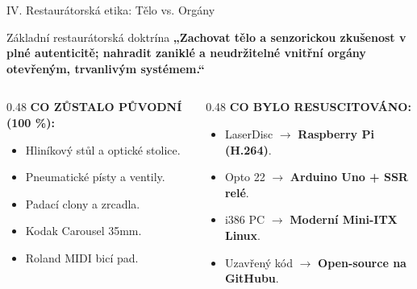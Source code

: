 \documentclass[aspectratio=169,11pt]{beamer}
\begin{document}
\begin{frame}{IV. Restaurátorská etika: Tělo vs. Orgány}
  \begin{block}{Základní restaurátorská doktrína}
    \centering\large\textbf{„Zachovat tělo a senzorickou zkušenost v plné autenticitě; nahradit zaniklé a neudržitelné vnitřní orgány otevřeným, trvanlivým systémem.“}
  \end{block}
  \vspace{0.4cm}
  \begin{columns}
    \begin{column}{0.48\textwidth}
      \textbf{CO ZŮSTALO PŮVODNÍ (100 \%):}
      \begin{itemize}
        \item Hliníkový stůl a optické stolice.
        \item Pneumatické písty a ventily.
        \item Padací clony a zrcadla.
        \item Kodak Carousel 35mm.
        \item Roland MIDI bicí pad.
      \end{itemize}
    \end{column}
    \begin{column}{0.48\textwidth}
      \textbf{CO BYLO RESUSCITOVÁNO:}
      \begin{itemize}
        \item LaserDisc $\rightarrow$ \textbf{Raspberry Pi (H.264)}.
        \item Opto 22 $\rightarrow$ \textbf{Arduino Uno + SSR relé}.
        \item i386 PC $\rightarrow$ \textbf{Moderní Mini-ITX Linux}.
        \item Uzavřený kód $\rightarrow$ \textbf{Open-source na GitHubu}.
      \end{itemize}
    \end{column}
  \end{columns}
\end{frame}
\end{document}

